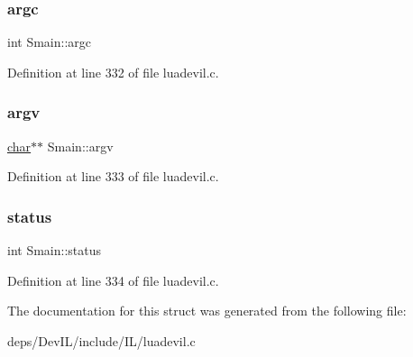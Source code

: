 \subsubsection{\texorpdfstring{argc}{argc}}
{\footnotesize\ttfamily int Smain\+::argc}



Definition at line 332 of file luadevil.\+c.

\mbox{\label{structSmain_a2cca5942f822cee2e819694285acbd2c}} 
\subsubsection{\texorpdfstring{argv}{argv}}
{\footnotesize\ttfamily \hyperlink{classchar}{char}$\ast$$\ast$ Smain\+::argv}



Definition at line 333 of file luadevil.\+c.

\mbox{\label{structSmain_af22c8bf033c96eaa9e0e29264fc9631e}} 
\subsubsection{\texorpdfstring{status}{status}}
{\footnotesize\ttfamily int Smain\+::status}



Definition at line 334 of file luadevil.\+c.



The documentation for this struct was generated from the following file\+:\begin{DoxyCompactItemize}
\item 
deps/\+Dev\+I\+L/include/\+I\+L/luadevil.\+c\end{DoxyCompactItemize}

